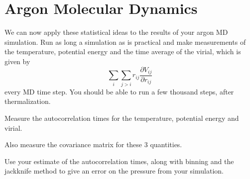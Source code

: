 \section{Argon Molecular Dynamics}

We can now apply these statistical ideas to the results of your argon MD simulation. Run as
long a simulation as is practical and make measurements of the temperature, potential energy
and the time average of the virial, which is given by
%
\begin{equation}
    \sum_i \sum_{j > i} r_{ij} \frac{ \partial V_{ij} }{ \partial r_{ij} }
\end{equation}
%
every MD time step. You should be able to run a few thousand steps, after thermalization.


\Question{} Measure the autocorrelation times for the temperature, potential energy and
virial.

\Answer{}




\Question{} Also measure the covariance matrix for these \(3\) quantities.

\Answer{}



\Question{} Use your estimate of the autocorrelation times, along with binning and the
jackknife method to give an error on the pressure from your simulation.

\Answer{}

